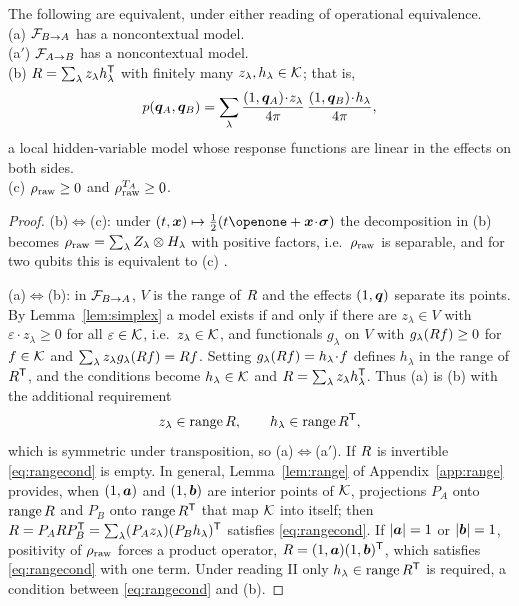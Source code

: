 \begin{theorem}
\label{thm:pair}
The following are equivalent, under either reading of operational equivalence.\\
(a) $\mathcal{F}_{B\to A}$ has a noncontextual model.\\
(a$'$) $\mathcal{F}_{A\to B}$ has a noncontextual model.\\
(b) $R=\sum_\lambda z_\lambda h_\lambda^{\mathsf{T}}$ with finitely many $z_\lambda,h_\lambda\in\mathcal{K}$; that is,
\begin{equation}
p(\bm{q}_A,\bm{q}_B)=\sum_\lambda\frac{(1,\bm{q}_A)\!\cdot\!z_\lambda}{4\pi}\,\frac{(1,\bm{q}_B)\!\cdot\!h_\lambda}{4\pi},
\label{eq:localnc}
\end{equation}
a local hidden-variable model whose response functions are linear in the effects on both sides.\\
(c) $\rho_{\mathrm{raw}}\ge0$ and $\rho_{\mathrm{raw}}^{T_A}\ge0$.
\end{theorem}

\begin{proof}
(b)$\Leftrightarrow$(c): under $(t,\bx)\mapsto\tfrac12(t\openone+\bx\!\cdot\!\bsig)$ the decomposition in (b) becomes $\rho_{\mathrm{raw}}=\sum_\lambda Z_\lambda\otimes H_\lambda$ with positive factors, i.e.\ $\rho_{\mathrm{raw}}$ is separable, and for two qubits this is equivalent to (c) \cite{peres1996,horodecki1996ppt}.

(a)$\Leftrightarrow$(b): in $\mathcal{F}_{B\to A}$, $V$ is the range of $R$ and the effects $(1,\bm{q})$ separate its points. By Lemma~\ref{lem:simplex} a model exists if and only if there are $z_\lambda\in V$ with $\varepsilon\!\cdot\!z_\lambda\ge0$ for all $\varepsilon\in\mathcal{K}$, i.e.\ $z_\lambda\in\mathcal{K}$, and functionals $g_\lambda$ on $V$ with $g_\lambda(R f)\ge0$ for $f\in\mathcal{K}$ and $\sum_\lambda z_\lambda g_\lambda(R f)=R f$. Setting $g_\lambda(R f)=h_\lambda\!\cdot\!f$ defines $h_\lambda$ in the range of $R^{\mathsf{T}}$, and the conditions become $h_\lambda\in\mathcal{K}$ and $R=\sum_\lambda z_\lambda h_\lambda^{\mathsf{T}}$. Thus (a) is (b) with the additional requirement
\begin{equation}
z_\lambda\in\operatorname{range}R,\qquad h_\lambda\in\operatorname{range}R^{\mathsf{T}},
\label{eq:rangecond}
\end{equation}
which is symmetric under transposition, so (a)$\Leftrightarrow$(a$'$). If $R$ is invertible \eqref{eq:rangecond} is empty. In general, Lemma~\ref{lem:range} of Appendix~\ref{app:range} provides, when $(1,\bm{a})$ and $(1,\bm{b})$ are interior points of $\mathcal{K}$, projections $P_A$ onto $\operatorname{range}R$ and $P_B$ onto $\operatorname{range}R^{\mathsf{T}}$ that map $\mathcal{K}$ into itself; then $R=P_AR P_B^{\mathsf{T}}=\sum_\lambda(P_Az_\lambda)(P_Bh_\lambda)^{\mathsf{T}}$ satisfies \eqref{eq:rangecond}. If $|\bm{a}|=1$ or $|\bm{b}|=1$, positivity of $\rho_{\mathrm{raw}}$ forces a product operator, $R=(1,\bm{a})(1,\bm{b})^{\mathsf{T}}$, which satisfies \eqref{eq:rangecond} with one term. Under reading II only $h_\lambda\in\operatorname{range}R^{\mathsf{T}}$ is required, a condition between \eqref{eq:rangecond} and (b).
\end{proof}

